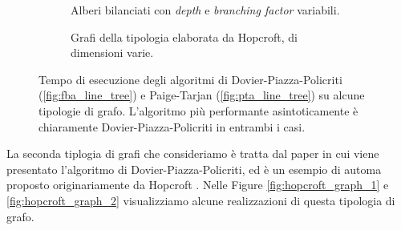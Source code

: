 \begin{figure}
    \begin{subfigure}[t]{0.49\textwidth}
        \caption{Alberi bilanciati con \emph{depth} e \emph{branching factor} variabili.}
        \label{fig:tree_exp_result}
    \end{subfigure}
    \begin{subfigure}[t]{0.49\textwidth}
        \caption{Grafi della tipologia elaborata da Hopcroft, di dimensioni varie.}
        \label{fig:hopcroft_exp_result}
    \end{subfigure}
    \caption{Tempo di esecuzione degli algoritmi di Dovier-Piazza-Policriti (\ref*{fig:fba_line_tree}) e Paige-Tarjan (\ref*{fig:pta_line_tree}) su alcune tipologie di grafo. L'algoritmo più performante asintoticamente è chiaramente Dovier-Piazza-Policriti in entrambi i casi.}
\end{figure}

La seconda tiplogia di grafi che consideriamo è tratta dal paper in cui viene presentato l'algoritmo di Dovier-Piazza-Policriti, ed è un esempio di automa proposto originariamente da Hopcroft \cite{hopcroft}. Nelle Figure \ref{fig:hopcroft_graph_1} e \ref{fig:hopcroft_graph_2} visualizziamo alcune realizzazioni di questa tipologia di grafo.

